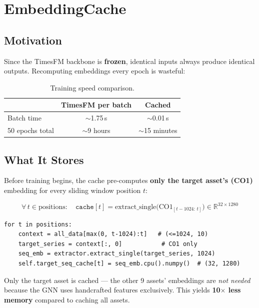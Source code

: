 \documentclass[11pt,a4paper]{article}
\begin{document}
\section{EmbeddingCache}

\subsection{Motivation}

Since the TimesFM backbone is \textbf{frozen}, identical inputs always produce identical outputs. Recomputing embeddings every epoch is wasteful:

\begin{table}[h]
\centering
\caption{Training speed comparison.}
\begin{tabular}{@{}lcc@{}}
\toprule
& \textbf{TimesFM per batch} & \textbf{Cached} \\
\midrule
Batch time & $\sim$1.75\,s & $\sim$0.01\,s \\
50 epochs total & $\sim$9 hours & $\sim$15 minutes \\
\bottomrule
\end{tabular}
\end{table}

\subsection{What It Stores}

Before training begins, the cache pre-computes \textbf{only the target asset's (CO1)} embedding for every sliding window position $t$:

\[
\forall\, t \in \text{positions}: \quad
\texttt{cache}[t] = \text{extract\_single}\!\bigl(\text{CO1}_{[t-1024:\,t]}\bigr) \in \mathbb{R}^{32 \times 1280}
\]

\begin{lstlisting}
for t in positions:
    context = all_data[max(0, t-1024):t]   # (<=1024, 10)
    target_series = context[:, 0]           # CO1 only
    seq_emb = extractor.extract_single(target_series, 1024)
    self.target_seq_cache[t] = seq_emb.cpu().numpy()  # (32, 1280)
\end{lstlisting}

\noindent
Only the target asset is cached --- the other 9 assets' embeddings are \emph{not needed} because the GNN uses handcrafted features exclusively. This yields \textbf{10$\times$ less memory} compared to caching all assets.
\end{document}
